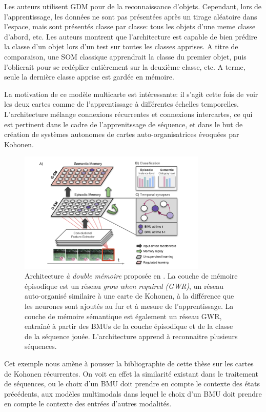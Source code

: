 \documentclass[../main]{subfiles}
\begin{document}
Les auteurs utilisent GDM pour de la reconnaissance d'objets. Cependant, lors de l'apprentissage, les données ne sont pas présentées après un tirage aléatoire dans l'espace, mais sont présentés classe par classe: tous les objets d'une meme classe d'abord, etc. Les auteurs montrent que l'architecture est capable de bien prédire la classe d'un objet lors d'un test sur toutes les classes apprises. A titre de comparaison, une SOM classique apprendrait la classe du premier objet, puis l'oblierait pour se redéplier entièrement sur la deuxième classe, etc. A terme, seule la dernière classe apprise est gardée en mémoire.

La motivation de ce modèle multicarte est intéressante: il s'agit cette fois de voir les deux cartes comme de l'apprentissage à différentes échelles temporelles. L'architecture mélange connexions récurrentes et connexions intercartes, ce qui est pertinent dans le cadre de l'apprenitssage de séquence, et dans le but de création de systèmes autonomes de cartes auto-organisatrices évoquées par Kohonen.


\begin{figure}
    \centering
    \includegraphics[width=0.8\textwidth]{Parisi_2020.pdf}
    \caption{Architecture \emph{à double mémoire} proposée en \cite{parisiLL}. La couche de mémoire épisodique est un réseau \emph{grow when required (GWR)}, un réseau auto-organisé similaire à une carte de Kohonen, à la différence que les neurones sont ajoutés au fur et à mesure de l'apprentissage. La couche de mémoire sémantique est également un réseau GWR, entraîné à partir des BMUs de la couche épisodique et de la classe de la séquence jouée. L'architecture apprend à reconnaitre plusieurs séquences.\label{fig:gdm_parisi}}
\end{figure}

Cet exemple nous amène à pousser la bibliographie de cette thèse sur les cartes de Kohonen récurrentes. On voit en effet la similarité existant dans le traitement de séquences, ou le choix d'un BMU doit prendre en compte le contexte des états précédents, aux modèles multimodals dans lequel le choix d'un BMU doit prendre en compte le contexte des entrées d'autres modalités.
\end{document}
